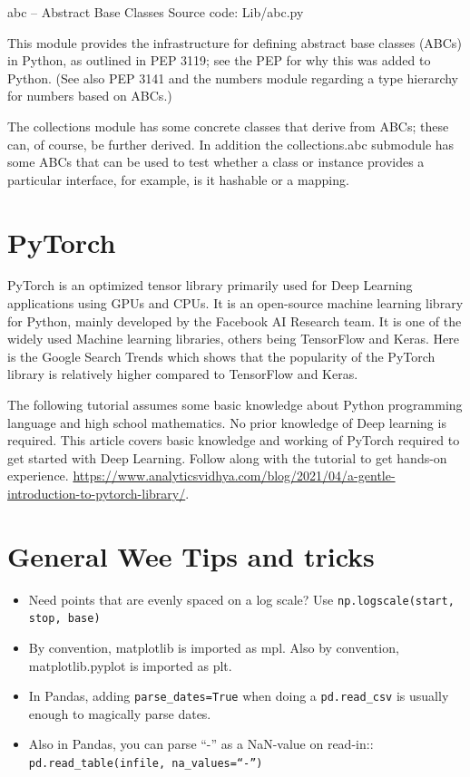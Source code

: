 \documentclass[11pt,a4paper]{article}
\begin{document}
 abc -- Abstract Base Classes
Source code: Lib/abc.py

This module provides the infrastructure for defining abstract base classes (ABCs) in Python, as outlined in PEP 3119; see the PEP for why this was added to Python. (See also PEP 3141 and the numbers module regarding a type hierarchy for numbers based on ABCs.)

The collections module has some concrete classes that derive from ABCs; these can, of course, be further derived. In addition the collections.abc submodule has some ABCs that can be used to test whether a class or instance provides a particular interface, for example, is it hashable or a mapping.




\newpage
\section{PyTorch}
PyTorch is an optimized tensor library primarily used for Deep Learning applications using GPUs and CPUs. It is an open-source machine learning library for Python, mainly developed by the Facebook AI Research team. It is one of the widely used Machine learning libraries, others being TensorFlow and Keras. Here is the Google Search Trends which shows that the popularity of the PyTorch library is relatively higher compared to TensorFlow and Keras.

The following tutorial assumes some basic knowledge about Python programming language and high school mathematics. No prior knowledge of Deep learning is required. This article covers basic knowledge and working of PyTorch required to get started with Deep Learning. Follow along with the tutorial to get hands-on experience.
\href{https://www.analyticsvidhya.com/blog/2021/04/a-gentle-introduction-to-pytorch-library/}{https://www.analyticsvidhya.com/blog/2021/04/a-gentle-introduction-to-pytorch-library/}.



 
\newpage
\section{General Wee Tips and tricks}
\begin{itemize}
\item Need points that are evenly spaced on a log scale? Use {\tt np.logscale(start, stop, base)} 
\item By convention, matplotlib is imported as mpl. Also by convention, matplotlib.pyplot is imported as plt.
\item In Pandas, adding {\tt parse\_dates=True} when doing a {\tt pd.read\_csv} is usually enough to magically parse dates. 
\item Also in Pandas, you can parse ``-'' as a NaN-value on read-in:: {\tt pd.read\_table(infile, na\_values=``-'')}
\end{itemize}
\end{document}
